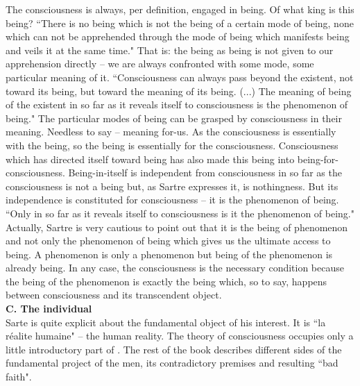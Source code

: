 The consciousness is always, per definition, engaged in being. Of what king is this being? ``There is no being 
which is not the being of a certain mode of being, none which can not be apprehended through the mode of being 
which manifests being and veils it at the same time." \cite{BN}   That is: the being as being is not given to our 
apprehension directly --  we are always confronted with some mode, some particular meaning of it. ``Consciousness 
can always pass beyond the existent, not toward its being, but toward the meaning of its being. (...) The meaning 
of being of the existent in so far as it reveals itself to consciousness is the phenomenon of being." \cite{BN}   The particular 
modes of being can be grasped by consciousness in their meaning. Needless to say -- meaning for-us. As the 
consciousness is essentially with the being, so the being is essentially for the consciousness. Consciousness 
which has directed itself toward being has also made this being into being-for-consciousness. Being-in-itself is 
independent from consciousness in so far as the consciousness is not a being but, as Sartre expresses it, is 
nothingness. But its independence is constituted for consciousness -- it is the phenomenon of being. ``Only in so far 
as it reveals itself to consciousness is it the phenomenon of being." \cite{BN}   Actually, Sartre is very cautious to point out 
that it is the being of phenomenon and not only the phenomenon of being which gives us the ultimate access to 
being. A phenomenon is only a phenomenon but being of the phenomenon is already being. In any case, the 
consciousness is the necessary condition because the being of the phenomenon is exactly the being which, so to 
say, happens between consciousness and its transcendent object. \\[1ex]
{\bf C. The individual} \\
Sarte is quite explicit about the fundamental object of his interest. 
It is ``la r{\'e}alite humaine" -- the human 
reality. The theory of consciousness occupies only a little introductory part of 
\cite{BN}. The rest of the book describes different sides of the fundamental project of the men, its contradictory 
premises and resulting ``bad faith".

